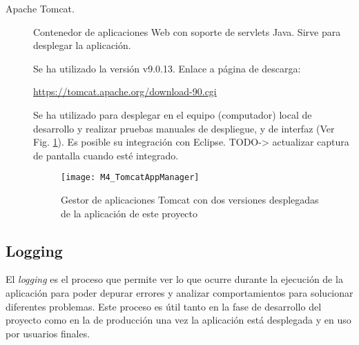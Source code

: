\begin{description}
	\item[Apache Tomcat.] Contenedor de aplicaciones Web con soporte de servlets Java. Sirve para desplegar la aplicación.
	
		Se ha utilizado la versión  v9.0.13. Enlace a página de descarga:
		
		\url{https://tomcat.apache.org/download-90.cgi}
		
		Se ha utilizado para desplegar en el equipo (computador) local de desarrollo y realizar pruebas manuales de despliegue, y de interfaz (Ver Fig. \ref{fig:M4_TomcatAppManager}). Es posible su integración con Eclipse.
		TODO-> actualizar captura de pantalla cuando esté integrado.
		
		\begin{figure}[!h]
			\centering
			\texttt{[image: M4\_TomcatAppManager]}
			\caption{Gestor de aplicaciones Tomcat con dos versiones desplegadas de la aplicación de este proyecto}\label{fig:M4_TomcatAppManager}
		\end{figure}
		\FloatBarrier
		
\end{description}
\subsection{Logging}
El \textit{logging} es el proceso que permite ver lo que ocurre durante la ejecución de la aplicación para poder depurar errores y analizar comportamientos para solucionar diferentes problemas. Este proceso es útil tanto en la fase de desarrollo del proyecto como en la de producción una vez la aplicación está desplegada y en uso por usuarios finales.

